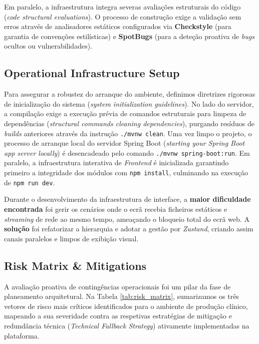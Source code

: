 \documentclass[11pt,a4paper]{article}
\begin{document}
Em paralelo, a infraestrutura integra severas avaliações estruturais do código (\textit{code structural evaluations}). O processo de construção exige a validação sem erros através de analisadores estáticos configurados via \textbf{Checkstyle} (para garantia de convenções estilísticas) e \textbf{SpotBugs} (para a deteção proativa de \textit{bugs} ocultos ou vulnerabilidades).

\subsection{Operational Infrastructure Setup}
Para assegurar a robustez do arranque do ambiente, definimos diretrizes rigorosas de inicialização do sistema (\textit{system initialization guidelines}). No lado do servidor, a compilação exige a execução prévia de comandos estruturais para limpeza de dependências (\textit{structural commands cleaning dependencies}), purgando resíduos de \textit{builds} anteriores através da instrução \texttt{./mvnw clean}. Uma vez limpo o projeto, o processo de arranque local do servidor Spring Boot (\textit{starting your Spring Boot app server locally}) é desencadeado pelo comando \texttt{./mvnw spring-boot:run}. Em paralelo, a infraestrutura interativa de \textit{Frontend} é inicializada garantindo primeiro a integridade dos módulos com \texttt{npm install}, culminando na execução de \texttt{npm run dev}. 

Durante o desenvolvimento da infraestrutura de interface, a \textbf{maior dificuldade encontrada} foi gerir os cenários onde o ecrã recebia ficheiros estáticos e \textit{streaming} de rede ao mesmo tempo, ameaçando o bloqueio total do ecrã web. A \textbf{solução} foi refatorizar a hierarquia e adotar a gestão por \textit{Zustand}, criando assim canais paralelos e limpos de exibição visual.

\subsection{Risk Matrix \& Mitigations}
A avaliação proativa de contingências operacionais foi um pilar da fase de planeamento arquitetural. Na Tabela \ref{tab:risk_matrix}, sumarizamos os três vetores de risco mais críticos identificados para o ambiente de produção clínico, mapeando a sua severidade contra as respetivas estratégias de mitigação e redundância técnica (\textit{Technical Fallback Strategy}) ativamente implementadas na plataforma.
\end{document}
